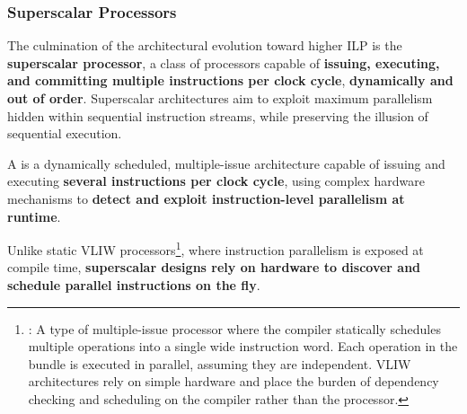 \subsubsection{Superscalar Processors}

The culmination of the architectural evolution toward higher ILP is the \textbf{superscalar processor}, a class of processors capable of \textbf{issuing, executing, and committing multiple instructions per clock cycle}, \textbf{dynamically and out of order}. Superscalar architectures aim to exploit maximum parallelism hidden within sequential instruction streams, while preserving the illusion of sequential execution.

\highspace
\begin{definitionbox}
    A  is a dynamically scheduled, multiple-issue architecture capable of issuing and executing \textbf{several instructions per clock cycle}, using complex hardware mechanisms to \textbf{detect and exploit instruction-level parallelism at runtime}.
\end{definitionbox}

\noindent
Unlike static VLIW processors\footnote{%
    : A type of multiple-issue processor where the compiler statically schedules multiple operations into a single wide instruction word. Each operation in the bundle is executed in parallel, assuming they are independent. VLIW architectures rely on simple hardware and place the burden of dependency checking and scheduling on the compiler rather than the processor.
}, where instruction parallelism is exposed at compile time, \textbf{superscalar designs rely on hardware to discover and schedule parallel instructions on the fly}.

